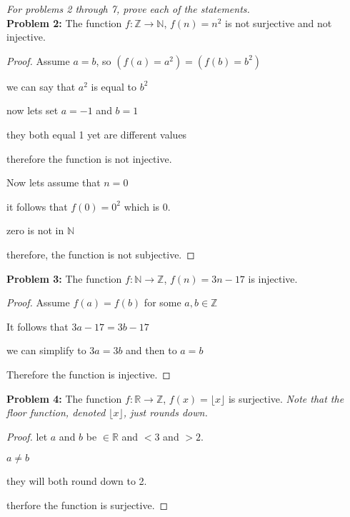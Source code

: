 \documentclass[12pt]{article}
\def\R{\mathbb R} %
\def\Z{\mathbb Z}
\def\N{\mathbb N}
\begin{document}
\textit{For problems 2 through 7, prove each of the statements.} \\ 

{\bf Problem 2:} The function $f:\Z \rightarrow \N$, $f(n)= n^2$ is not surjective and not injective.\\

\begin{proof}

    Assume $a=b$, so $(f(a)=a^2)=(f(b)=b^2)$

    we can say that $a^2$ is equal to $b^2$

    now lets set $a=-1$ and $b=1$

    they both equal 1 yet are different values

    therefore the function is not injective.

    Now lets assume that $n=0$

    it follows that $f(0)=0^2$ which is 0.

    zero is not in $\N$

    therefore, the function is not subjective.

\end{proof}

{\bf Problem 3:} The function $f:\N \rightarrow \Z$, $f(n)= 3n-17$ is injective.\\

\begin{proof}

    Assume $f(a)=f(b)$ for some $a,b\in\Z$

    It follows that $3a-17=3b-17$

    we can simplify to $3a=3b$ and then to $a=b$

    Therefore the function is injective.

\end{proof}

{\bf Problem 4:} The function $f:\R \rightarrow \Z$, $f(x)= \lfloor x \rfloor$ is surjective. \textit{Note that the floor function, denoted $\lfloor x \rfloor$, just rounds down. \\}

\begin{proof}

    let $a$ and $b$ be $\in \R$ and $<3$ and $>2$.

    $a\neq b$

    they will both round down to 2.

    therfore the function is surjective.


\end{proof}
\end{document}

